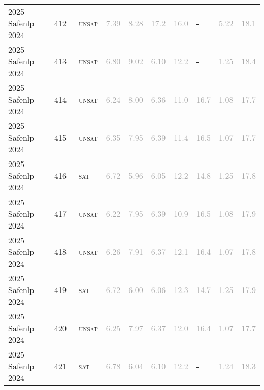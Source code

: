 \begin{center}
{\begin{longtable}{@{}llllllllll@{}}
2025 Safenlp 2024 & 412 & ~\textsc{unsat} & \textcolor{darkgray}{7.39} & \textcolor{darkgray}{8.28} & \textcolor{darkgray}{17.2} & \textcolor{darkgray}{16.0} & - & \textcolor{darkgray}{5.22} & \textcolor{darkgray}{18.1} \\
2025 Safenlp 2024 & 413 & ~\textsc{unsat} & \textcolor{darkgray}{6.80} & \textcolor{darkgray}{9.02} & \textcolor{darkgray}{6.10} & \textcolor{darkgray}{12.2} & - & \textcolor{darkgray}{1.25} & \textcolor{darkgray}{18.4} \\
2025 Safenlp 2024 & 414 & ~\textsc{unsat} & \textcolor{darkgray}{6.24} & \textcolor{darkgray}{8.00} & \textcolor{darkgray}{6.36} & \textcolor{darkgray}{11.0} & \textcolor{darkgray}{16.7} & \textcolor{darkgray}{1.08} & \textcolor{darkgray}{17.7} \\
2025 Safenlp 2024 & 415 & ~\textsc{unsat} & \textcolor{darkgray}{6.35} & \textcolor{darkgray}{7.95} & \textcolor{darkgray}{6.39} & \textcolor{darkgray}{11.4} & \textcolor{darkgray}{16.5} & \textcolor{darkgray}{1.07} & \textcolor{darkgray}{17.7} \\
2025 Safenlp 2024 & 416 & ~\textsc{sat} & \textcolor{darkgray}{6.72} & \textcolor{darkgray}{5.96} & \textcolor{darkgray}{6.05} & \textcolor{darkgray}{12.2} & \textcolor{darkgray}{14.8} & \textcolor{darkgray}{1.25} & \textcolor{darkgray}{17.8} \\
2025 Safenlp 2024 & 417 & ~\textsc{unsat} & \textcolor{darkgray}{6.22} & \textcolor{darkgray}{7.95} & \textcolor{darkgray}{6.39} & \textcolor{darkgray}{10.9} & \textcolor{darkgray}{16.5} & \textcolor{darkgray}{1.08} & \textcolor{darkgray}{17.9} \\
2025 Safenlp 2024 & 418 & ~\textsc{unsat} & \textcolor{darkgray}{6.26} & \textcolor{darkgray}{7.91} & \textcolor{darkgray}{6.37} & \textcolor{darkgray}{12.1} & \textcolor{darkgray}{16.4} & \textcolor{darkgray}{1.07} & \textcolor{darkgray}{17.8} \\
2025 Safenlp 2024 & 419 & ~\textsc{sat} & \textcolor{darkgray}{6.72} & \textcolor{darkgray}{6.00} & \textcolor{darkgray}{6.06} & \textcolor{darkgray}{12.3} & \textcolor{darkgray}{14.7} & \textcolor{darkgray}{1.25} & \textcolor{darkgray}{17.9} \\
2025 Safenlp 2024 & 420 & ~\textsc{unsat} & \textcolor{darkgray}{6.25} & \textcolor{darkgray}{7.97} & \textcolor{darkgray}{6.37} & \textcolor{darkgray}{12.0} & \textcolor{darkgray}{16.4} & \textcolor{darkgray}{1.07} & \textcolor{darkgray}{17.7} \\
2025 Safenlp 2024 & 421 & ~\textsc{sat} & \textcolor{darkgray}{6.78} & \textcolor{darkgray}{6.04} & \textcolor{darkgray}{6.10} & \textcolor{darkgray}{12.2} & - & \textcolor{darkgray}{1.24} & \textcolor{darkgray}{18.3} \\

\end{longtable}}
\end{center}
